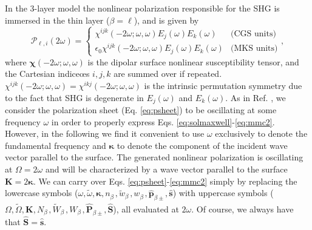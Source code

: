 In the 3-layer model the nonlinear polarization responsible for the SHG is
immersed in the thin layer ($\beta=\ell$), and is given by
\begin{equation}\label{eq:tres}
\mathcal{P}_{\ell,i}(2\omega)=
\left\{
\begin{array}{cc}
\chi^{ijk}(-2\omega;\omega,\omega)E_{j}(\omega)E_{k}(\omega)
    & \text{(CGS units)}\\
\epsilon_{0}\chi^{ijk}(-2\omega;\omega,\omega)E_{j}(\omega)E_{k}(\omega)
    & \text{(MKS units)}
\end{array}
\right.,
\end{equation}
where $\boldsymbol{\chi}(-2\omega;\omega,\omega)$ is the dipolar surface
nonlinear susceptibility tensor, and the Cartesian indiceœs $i,j,k$ are summed
over if repeated. $\chi^{ijk}(-2\omega;\omega,\omega) =
\chi^{ikj}(-2\omega;\omega,\omega)$ is the intrinsic permutation symmetry due to
the fact that SHG is degenerate in $E_{j}(\omega)$ and $E_{k}(\omega)$. As in
Ref. \cite{mizrahiJOSA88}, we consider the polarization sheet (Eq.
\eqref{eq:psheet}) to be oscillating at some frequency $\omega$ in order to
properly express Eqs. \eqref{eq:solmaxwell}-\eqref{eq:mmc2}. However, in the
following we find it convenient to use $\omega$ exclusively to denote the
fundamental frequency and $\boldsymbol{\kappa}$ to denote the component of the
incident wave vector parallel to the surface. The generated nonlinear
polarization is oscillating at $\Omega = 2\omega$ and will be characterized by a
wave vector parallel to the surface $\mathbf{K} = 2\boldsymbol{\kappa}$. We can
carry over Eqs. \eqref{eq:psheet}-\eqref{eq:mmc2} simply by replacing the
lowercase symbols
($\omega,\tilde{\omega},\boldsymbol{\kappa},n^{\phantom{A}}_{\beta},
\tilde{w}^{\phantom{A}}_{\beta},w^{\phantom{A}}_{\beta},
\hat{\mathbf{p}}^{\phantom{A}}_{\beta\pm},\hat{\mathbf{s}}$) with uppercase
symbols ($\Omega,\tilde{\Omega},\mathbf{K},N^{\phantom{A}}_{\beta},
\tilde{W}^{\phantom{A}}_{\beta},W^{\phantom{A}}_{\beta},
\hat{\mathbf{P}}_{\beta\pm},\hat{\mathbf{S}}$), all evaluated at $2\omega$. Of
course, we always have that $\hat{\mathbf{S}}=\hat{\mathbf{s}}$.

